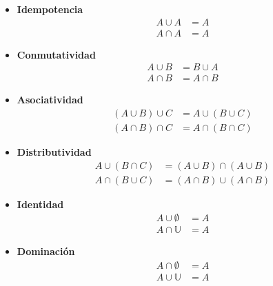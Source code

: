 \begin{itemize}

\item \textbf{Idempotencia}
\begin{equation}
    \begin{array}{ll}
        A \cup A & = A \\
        A \cap A & = A
    \end{array}
\end{equation}

\item \textbf{Conmutatividad}
\begin{equation}
    \begin{array}{ll}
        A \cup B & = B \cup A \\
        A \cap B & = A \cap B
    \end{array}
\end{equation}

\item \textbf{Asociatividad}
\begin{equation}
    \begin{array}{ll}
        (A \cup B) \cup C & = A \cup (B \cup C) \\
        (A \cap B) \cap C & = A \cap (B \cap C)
    \end{array}
\end{equation}

\item \textbf{Distributividad}
\begin{equation}
    \begin{array}{ll}
        A \cup (B \cap C) & = (A \cup B) \cap (A \cup B) \\
        A \cap (B \cup C) & = (A \cap B) \cup (A \cap B)
    \end{array}
\end{equation}

\item \textbf{Identidad}
\begin{equation}
    \begin{array}{ll}
        A \cup \emptyset & = A \\
        A \cap \mathbb{U} & = A
    \end{array}
\end{equation}

\item \textbf{Dominación}
\begin{equation}
    \begin{array}{ll}
        A \cap \emptyset & = A \\
        A \cup \mathbb{U} & = A
    \end{array}
\end{equation}


\end{itemize}
